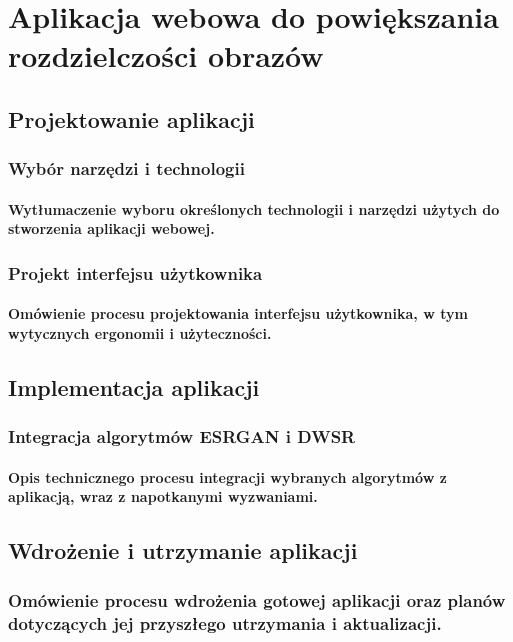 \chapter{Aplikacja webowa do powiększania rozdzielczości obrazów}
\section{Projektowanie aplikacji}
\subsection{Wybór narzędzi i technologii}
\subsubsection{Wytłumaczenie wyboru określonych technologii i narzędzi użytych do stworzenia aplikacji webowej.}
\subsection{Projekt interfejsu użytkownika}
\subsubsection{Omówienie procesu projektowania interfejsu użytkownika, w tym wytycznych ergonomii i użyteczności.}
\section{Implementacja aplikacji}
\subsection{Integracja algorytmów ESRGAN i DWSR}
\subsubsection{Opis technicznego procesu integracji wybranych algorytmów z aplikacją, wraz z napotkanymi wyzwaniami.}
\section{Wdrożenie i utrzymanie aplikacji}
\subsection{Omówienie procesu wdrożenia gotowej aplikacji oraz planów dotyczących jej przyszłego utrzymania i aktualizacji.}
